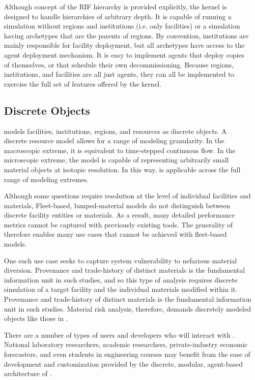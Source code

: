 Although concept of the \gls{RIF} hierarchy is provided explicitly, the \Cyclus kernel is
designed to handle hierarchies of arbitrary depth.  It is capable of 
running a simulation without regions and institutions (i.e.  only facilities)
or a simulation having archetypes that are the parents of regions.  By
convention, institutions are mainly responsible for facility deployment, but
all archetypes have access to the agent deployment mechanism.  It is easy
to implement agents that deploy copies of themselves, or that schedule their
own decommissioning.  Because regions, institutions, and facilities are all
just agents, they can all be implemented to exercise the full set of features
offered by the \Cyclus kernel.

\subsection{Discrete Objects}

\Cyclus models facilities, institutions, regions, and resources as discrete 
objects. A discrete resource model allows for a range of modeling granularity. In the
macroscopic extreme, it is equivalent to time-stepped continuous flow. In the
microscopic extreme, the model is capable of representing arbitrarily small 
material objects at isotopic resolution. In this way, \Cyclus is 
applicable across the full range of modeling extremes. 

Although some questions require resolution at the level of 
individual facilities and materials, 
Fleet-based, lumped-material models do not distinguish between discrete
facility entities or materials.  As a result, many detailed performance 
metrics cannot be captured with previously existing tools.
The generality of \Cyclus therefore enables many use cases 
that cannot be achieved with fleet-based models. 

One such use case seeks to capture system vulnerability to nefarious 
material diversion. Provenance and trade-history of distinct materials is the fundamental 
information unit in such studies, and so this type of analysis requires
 discrete simulation of a 
target facility and the individual materials modified within it. 
Provenance and trade-history of distinct materials is the fundamental 
information unit in such studies. 
Material risk analysis, therefore, demands discretely modeled objects like those 
in \Cyclus.

There are a number of types of users and developers who will 
interact with \Cyclus. National laboratory researchers,
academic researchers, private-industry economic forecasters, and even students 
in engineering courses may benefit from the ease of development and
customization provided by the discrete, modular, agent-based architecture of \Cyclus.

